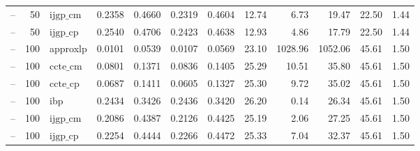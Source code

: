\begin{table}[ht]
\begin{tabular}{lrlrrrrrrrrr}
-- & 50 & $\text{ijgp\_cm}$ & 0.2358 & 0.4660 & 0.2319 & 0.4604 & 12.74 & 6.73 & 19.47 & 22.50 & 1.44 \\
-- & 50 & $\text{ijgp\_cp}$ & 0.2540 & 0.4706 & 0.2423 & 0.4638 & 12.93 & 4.86 & 17.79 & 22.50 & 1.44 \\
-- & 100 & approxlp & 0.0101 & 0.0539 & 0.0107 & 0.0569 & 23.10 & 1028.96 & 1052.06 & 45.61 & 1.50 \\
-- & 100 & $\text{ccte\_cm}$ & 0.0801 & 0.1371 & 0.0836 & 0.1405 & 25.29 & 10.51 & 35.80 & 45.61 & 1.50 \\
-- & 100 & $\text{ccte\_cp}$ & 0.0687 & 0.1411 & 0.0605 & 0.1327 & 25.30 & 9.72 & 35.02 & 45.61 & 1.50 \\
-- & 100 & ibp & 0.2434 & 0.3426 & 0.2436 & 0.3420 & 26.20 & 0.14 & 26.34 & 45.61 & 1.50 \\
-- & 100 & $\text{ijgp\_cm}$ & 0.2086 & 0.4387 & 0.2126 & 0.4425 & 25.19 & 2.06 & 27.25 & 45.61 & 1.50 \\
-- & 100 & $\text{ijgp\_cp}$ & 0.2254 & 0.4444 & 0.2266 & 0.4472 & 25.33 & 7.04 & 32.37 & 45.61 & 1.50 \\
\bottomrule
\end{tabular}
\end{table}
